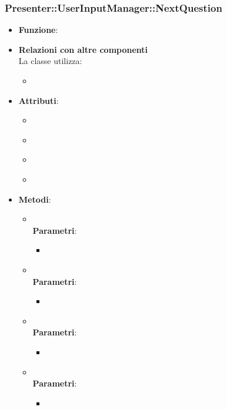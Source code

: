 \subsubsection{Presenter::UserInputManager::NextQuestion}
\begin{itemize}
\item\textbf{Funzione}:
\item\textbf{Relazioni con altre componenti}\\
La classe utilizza:
	\begin{itemize}
		\item
	\end{itemize}
\item\textbf{Attributi}:
	\begin{itemize}
		\item\code{}\\
		\item\code{}\\
		\item\code{}\\
		\item\code{}\\
	\end{itemize}
\item\textbf{Metodi}:
	\begin{itemize}
		\item\code{}\\
		\textbf{Parametri}:
			\begin{itemize}
				\item\code{}\\
			\end{itemize}
		\item\code{}\\
		\textbf{Parametri}:
			\begin{itemize}
				\item\code{}\\
			\end{itemize}
		\item\code{}\\
		\textbf{Parametri}:
			\begin{itemize}
				\item\code{}\\
			\end{itemize}
		\item\code{}\\
		\textbf{Parametri}:
			\begin{itemize}
				\item\code{}\\
			\end{itemize}
	\end{itemize}
\end{itemize}


